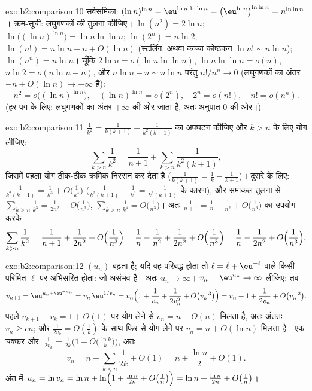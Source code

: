 \begin{solution}{exo:b2:comparison:10}
सर्वसमिका: $(\ln n)^{\ln n} = \eu^{\ln n\,\ln\ln n} =
\bigl(\eu^{\ln n}\bigr)^{\ln\ln n} = n^{\ln\ln n}$। क्रम-सूची: लघुगणकों की तुलना कीजिए। $\ln(n^2) = 2\ln n$; $\ln\bigl((\ln
n)^{\ln n}\bigr) = \ln n\ln\ln n$; $\ln(2^n) = n\ln2$; $\ln(n!) = n\ln n - n + O(\ln n)$
(स्टर्लिंग, अथवा कच्चा कोष्ठकन $\ln n! \sim n\ln n$); $\ln(n^n) = n\ln n$। चूँकि $2\ln n = o(\ln n\ln\ln n)$, $\ln n\ln\ln n = o(n)$, $n\ln 2 =
o(n\ln n - n)$, और $n \ln n - n \sim n\ln n$
परंतु $n! / n^n \to
0$ (लघुगणकों का अंतर $-n + O(\ln n) \to -\infty$ है):
\[
n^2 = o\bigl((\ln n)^{\ln n}\bigr),\quad
(\ln n)^{\ln n} = o(2^n),\quad
2^n = o(n!),\quad
n! = o(n^n).
\]
(हर पग के लिए: लघुगणकों का अंतर $+\infty$ की ओर जाता है, अतः अनुपात $0$ की
ओर।)
\end{solution}

\begin{solution}{exo:b2:comparison:11}
$\frac1{k^2} = \frac1{k(k+1)} + \frac1{k^2(k+1)}$ का अपघटन कीजिए और $k > n$ के लिए योग लीजिए:
\[
\sum_{k>n}\frac1{k^2} = \frac1{n+1} +
\sum_{k>n}\frac{1}{k^2(k+1)} ,
\]
जिसमें पहला योग ठीक-ठीक क्रमिक निरसन कर देता है ($\frac1{k(k+1)} = \frac1k -
\frac1{k+1}$)। दूसरे के लिए:
$\frac{1}{k^2(k+1)} = \frac1{k^3}
+ O\bigl(\frac1{k^4}\bigr)$ ($\frac{1}{k^2(k+1)} -
\frac1{k^3} = \frac{-1}{k^3(k+1)}$ के कारण), और समाकल-तुलना से $\sum_{k>n}\frac1{k^3} = \frac1{2n^2} +
O\bigl(\frac1{n^3}\bigr)$, $\sum_{k>n}\frac1{k^4} =
O\bigl(\frac1{n^3}\bigr)$। अतः $\frac1{n+1} = \frac1n - \frac1{n^2} +
O\bigl(\frac1{n^3}\bigr)$ का उपयोग करके
\[
\sum_{k>n}\frac1{k^2}
= \frac1{n+1} + \frac{1}{2n^2} + O\Bigl(\frac1{n^3}\Bigr)
= \frac1n - \frac1{n^2} + \frac{1}{2n^2} +
O\Bigl(\frac1{n^3}\Bigr)
= \frac1n - \frac{1}{2n^2} + O\Bigl(\frac1{n^3}\Bigr),
\]
\end{solution}

\begin{solution}{exo:b2:comparison:12}
$(u_n)$ बढ़ता है; यदि वह परिबद्ध होता तो $\ell = \ell + \eu^{-\ell}$ वाले किसी परिमित $\ell$ पर
अभिसरित होता: जो असंभव है। अतः $u_n \to \infty$। $v_n = \eu^{u_n} \to \infty$ लीजिए: तब
\[
v_{n+1} = \eu^{u_n + \eu^{-u_n}} = v_n\,\eu^{1/v_n}
= v_n\Bigl(1 + \frac1{v_n} + \frac1{2v_n^2} +
O\bigl(v_n^{-3}\bigr)\Bigr)
= v_n + 1 + \frac{1}{2v_n} + O\bigl(v_n^{-2}\bigr).
\]
पहले $v_{k+1} - v_k = 1 + O(1)$ पर योग लेने से $v_n = n +
O(n)$ मिलता है, अतः अंततः $v_n \geq cn$; और $\frac1{2v_k} = O(\frac1k)$ के साथ फिर
से योग लेने पर $v_n = n + O(\ln n)$ मिलता है। एक चक्कर और: $\frac{1}{2v_k} = \frac{1}{2k}\bigl(1 +
O\bigl(\tfrac{\ln k}k\bigr)\bigr)$, अतः
\[
v_n = n + \sum_{k<n}\frac1{2k} + O(1) = n + \frac{\ln n}2 +
O(1).
\]
अंत में $u_n = \ln v_n = \ln n + \ln\Bigl(1 + \frac{\ln n}{2n} +
O\bigl(\tfrac1n\bigr)\Bigr) = \ln n + \frac{\ln n}{2n} +
O\bigl(\tfrac1n\bigr)$।
\end{solution}

